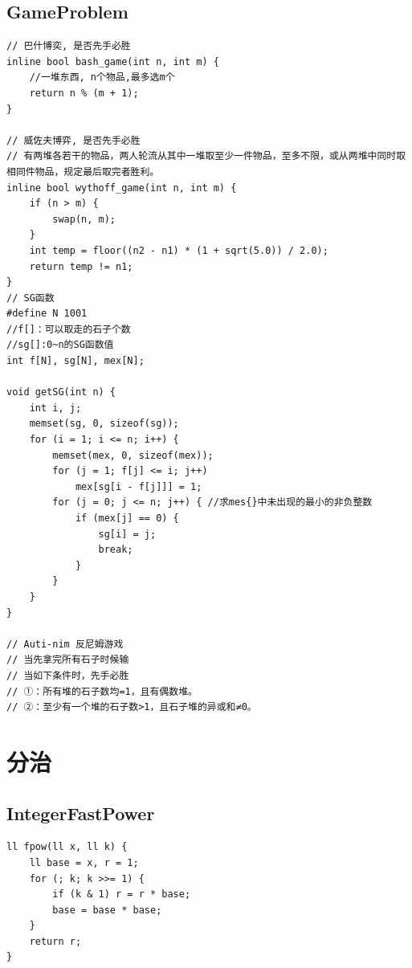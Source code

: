 \documentclass[twoside]{article}
\begin{document}
\subsection{GameProblem}
\begin{lstlisting}
// 巴什博奕, 是否先手必胜
inline bool bash_game(int n, int m) {
    //一堆东西, n个物品,最多选m个
    return n % (m + 1);
}

// 威佐夫博弈, 是否先手必胜
// 有两堆各若干的物品，两人轮流从其中一堆取至少一件物品，至多不限，或从两堆中同时取相同件物品，规定最后取完者胜利。
inline bool wythoff_game(int n, int m) {
    if (n > m) {
        swap(n, m);
    }
    int temp = floor((n2 - n1) * (1 + sqrt(5.0)) / 2.0);
    return temp != n1;
}
// SG函数
#define N 1001
//f[]：可以取走的石子个数
//sg[]:0~n的SG函数值
int f[N], sg[N], mex[N];

void getSG(int n) {
    int i, j;
    memset(sg, 0, sizeof(sg));
    for (i = 1; i <= n; i++) {
        memset(mex, 0, sizeof(mex));
        for (j = 1; f[j] <= i; j++)
            mex[sg[i - f[j]]] = 1;
        for (j = 0; j <= n; j++) { //求mes{}中未出现的最小的非负整数
            if (mex[j] == 0) {
                sg[i] = j;
                break;
            }
        }
    }
}

// Auti-nim 反尼姆游戏
// 当先拿完所有石子时候输
// 当如下条件时，先手必胜
// ①：所有堆的石子数均=1，且有偶数堆。 
// ②：至少有一个堆的石子数>1，且石子堆的异或和≠0。
\end{lstlisting}
\clearpage\section{分治}
\subsection{IntegerFastPower}
\begin{lstlisting}
ll fpow(ll x, ll k) {
    ll base = x, r = 1;
    for (; k; k >>= 1) {
        if (k & 1) r = r * base;
        base = base * base;
    }
    return r;
}\end{lstlisting}
\end{document}
